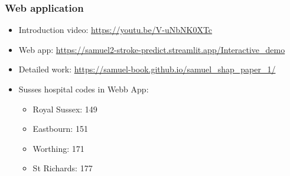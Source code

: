 \begin{frame}
\frametitle{Web application}

\begin{itemize}
    \item Introduction video: \url{https://youtu.be/V-uNbNK0XTc}
    \item Web app: \url{https://samuel2-stroke-predict.streamlit.app/Interactive_demo}
    \item Detailed work: \url{https://samuel-book.github.io/samuel_shap_paper_1/}
    \item Susses hospital codes in Webb App:
    \begin{itemize}
        \item Royal Sussex: 149
        \item Eastbourn: 151
        \item Worthing: 171
        \item St Richards: 177
    \end{itemize}
\end{itemize}
 
\end{frame}